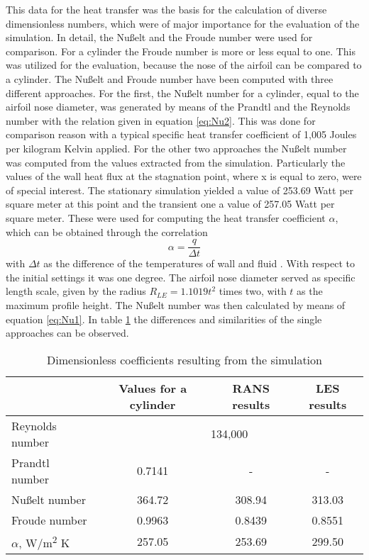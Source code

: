 This data for the heat transfer was the basis for the calculation of diverse dimensionless numbers, which were of major importance for the evaluation of the simulation.
In detail, the Nußelt and the Froude number were used for comparison. For a cylinder the Froude number is more or less equal to one. This was utilized for the evaluation, because the nose of the airfoil can be compared to a cylinder.
The Nußelt and Froude number have been computed with three different approaches. For the first, the Nußelt number for a cylinder, equal to the airfoil nose diameter, was generated by means of the Prandtl and the Reynolds number with the relation given in equation \ref{eq:Nu2}. This was done for comparison reason with a typical specific heat transfer coefficient of 1,005 Joules per kilogram Kelvin applied.
For the other two approaches the Nußelt number was computed from the values extracted from the simulation. Particularly the values of the wall heat flux at the stagnation point, where x is equal to zero, were of special interest. The stationary simulation yielded a value of 253.69 Watt per square meter at this point and the transient one a value of 257.05 Watt per square meter. These were used  for computing the heat transfer coefficient $\alpha$, which can be obtained through the correlation
\begin{equation}
\alpha = \frac{q}{\Delta t}
\end{equation} 
with $\Delta t$ as the difference of the temperatures of wall and fluid \cite{cerbe}. With respect to the initial settings it was one degree. The airfoil nose diameter served as specific length scale, given by the radius $R_{LE} = 1.1019 t^2$ times two, with $t$ as the maximum profile height.
The Nußelt number was then calculated by means of equation \ref{eq:Nu1}.
In table \ref{tab:coefficients} the differences and similarities of the single approaches can be observed.

\begin{table}[ht]
\centering
\caption{Dimensionless coefficients resulting from the simulation}
\label{tab:coefficients}
\begin{tabular}{l | ccc}
&Values for a cylinder&RANS results&LES results\\
\hline
Reynolds number&\multicolumn{3}{c}{134,000}\\
Prandtl number&0.7141&-&-\\
Nußelt number&364.72&308.94&313.03\\
Froude number&0.9963&0.8439&0.8551\\
$\alpha$, W/m\textsuperscript{2} K&257.05&253.69&299.50\\
\end{tabular}
\end{table}